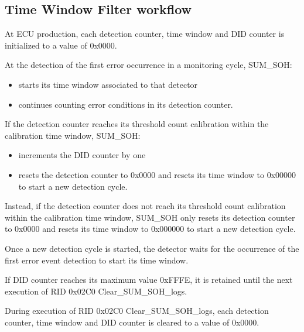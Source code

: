 \subsection{Time Window Filter workflow}
\label{subsec:timeWindowFilter}
{
	At ECU production, each detection counter, time window and DID counter is initialized to a value of 0x0000.
}
{	  	}

{
	At the detection of the first error occurrence in a monitoring cycle, SUM_SOH:
	\begin{itemize}
		\item starts its time window associated to that detector
		\item continues counting error conditions in its detection counter.
	\end{itemize}
}
{		}

{
	If the detection counter reaches its threshold count calibration within the calibration time window, SUM_SOH:
	\begin{itemize}
		\item increments the DID counter by one
		\item resets the detection counter to 0x0000 and resets its time window to 0x00000 to start a new detection cycle.
	\end{itemize}
}
{		}

{
	Instead, if the detection counter does not reach its threshold count calibration within the calibration time window, SUM_SOH only resets its detection counter to 0x0000 and resets its time window to 0x000000 to start a new detection cycle.
}
{		}

{
	Once a new detection cycle is started, the detector waits for the occurrence of the first error event detection to start its time window.
}
{		}

{
	If DID counter reaches its maximum value 0xFFFE, it is retained until the next execution of RID 0x02C0 Clear_SUM_SOH_logs.
}
{		}

{
	During execution of RID 0x02C0 Clear_SUM_SOH_logs, each detection counter, time window and DID counter is cleared to a value of 0x0000.
}
{		 	}


